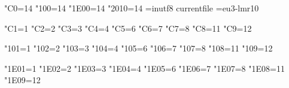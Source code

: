 

\ifx\kcatcode\undefined\else
  \kcatcode"C0=14  %
  \kcatcode"100=14 %
  \kcatcode"1E00=14 %
  \kcatcode"2010=14 %
\fi
\ifx\ocp\undefined\else
  \ocp\ORGin=inutf8
  \InputTranslation currentfile \ORGin
\fi
\font\x=eu3-lmr10 \x
\parindent0pt

\catcode"C1=1
\catcode"C2=2
\catcode"C3=3
\catcode"C4=4
\catcode"C5=6
\catcode"C6=7
\catcode"C7=8
\catcode"C8=11
\catcode"C9=12
\immediate{}%
\immediate{}%
\immediate{}%
\immediate{}%
\immediate{}%
\immediate{}%
\immediate{}%
\immediate{}%

\catcode"101=1
\catcode"102=2
\catcode"103=3
\catcode"104=4
\catcode"105=6
\catcode"106=7
\catcode"107=8
\catcode"108=11
\catcode"109=12
\immediate{}%
\immediate{}%
\immediate{}%
\immediate{}%
\immediate{}%
\immediate{}%
\immediate{}%
\immediate{}%

\catcode"1E01=1
\catcode"1E02=2
\catcode"1E03=3
\catcode"1E04=4
\catcode"1E05=6
\catcode"1E06=7
\catcode"1E07=8
\catcode"1E08=11
\catcode"1E09=12
\immediate{}%
\immediate{}%
\immediate{}%
\immediate{}%
\immediate{}%
\immediate{}%
\immediate{}%
\immediate{}%


